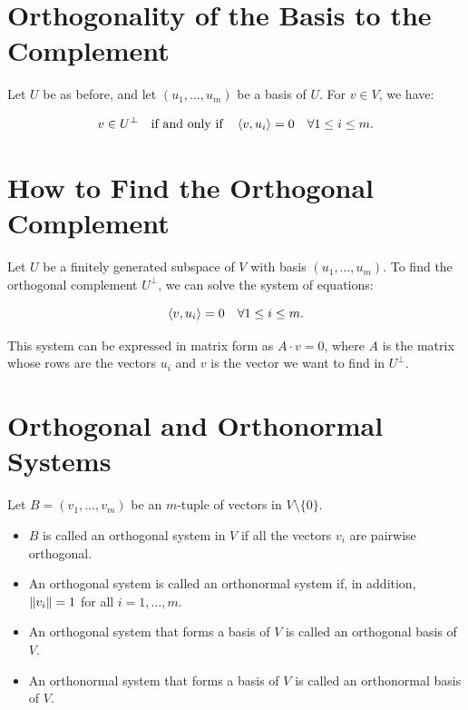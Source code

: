 \QED

\section{Orthogonality of the Basis to the Complement}

Let \( U \) be as before, and let \( (u_1, \ldots, u_m) \) be a basis of \( U \). For \( v \in V \), we 
have:

\[
    v \in U^\perp \quad \text{if and only if} \quad \left\langle v, u_i\right\rangle = 0 \quad \forall 1 \leq i \leq m.
\]

\section{How to Find the Orthogonal Complement}

Let \( U \) be a finitely generated subspace of \( V \) with basis \( (u_1, \ldots, u_m) \). To find the 
orthogonal complement \( U^\perp \), we can solve the system of equations:

\[
    \left\langle v, u_i\right\rangle = 0 \quad \forall 1 \leq i \leq m.
\]

This system can be expressed in matrix form as \( A \cdot v = 0 \), where \(A\) is the matrix whose rows 
are the vectors \( u_i \) and \( v \) is the vector we want to find in \( U^\perp \).

\section{Orthogonal and Orthonormal Systems}

Let \( B = (v_1, \ldots, v_m) \) be an \( m \)-tuple of vectors in \( V \setminus \{0\} \).

\begin{itemize}

    \item \(B\) is called an orthogonal system in \( V \) if all the vectors \( v_i \) are pairwise 
    orthogonal.

    \item An orthogonal system is called an orthonormal system if, in addition, \( \left\| v_i \right\| = 1 \) for 
    all \( i = 1, \ldots, m \).

    \item An orthogonal system that forms a basis of \( V \) is called an orthogonal basis of \( V \).

    \item An orthonormal system that forms a basis of \( V \) is called an orthonormal basis of \( V \).

\end{itemize}

